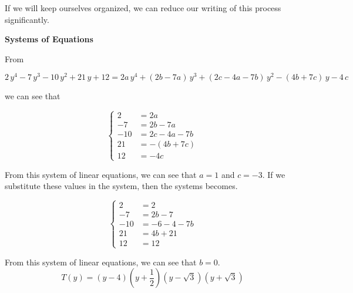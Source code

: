 \documentclass{ximera}
\begin{document}
If we will keep ourselves organized, we can reduce our writing of this process significantly.




\begin{procedure} \textbf{\textcolor{purple!85!blue}{Systems of Equations}} 



From

\[
2 \, y^4 - 7 \, y^3 - 10 \, y^2 + 21 \, y + 12 = 2 a \, y^4 + (2 b - 7 a) \, y^3 + (2 c - 4 a - 7 b) \, y^2 - (4 b + 7 c) \, y - 4 \, c
\]

we can see that 




\[
\begin{cases}
  2 &= 2 a   \\
  -7 &= 2 b - 7 a    \\
  -10 &= 2 c - 4 a - 7 b   \\
  21 &= -(4 b + 7 c)   \\
  12 &= -4 c
\end{cases}
\]


From this system of linear equations, we can see that $a = 1$ and $c = -3$.  If we substitute these values in the system, then the systems becomes.






\[
\begin{cases}
  2 &= 2   \\
  -7 &= 2 b - 7     \\
  -10 &= -6 - 4 - 7 b   \\
  21 &= 4 b + 21   \\
  12 &= 12
\end{cases}
\]

From this system of linear equations, we can see that $b = 0$. \\



\[
T(y) = (y-4) \left(y+\frac{1}{2}\right) (y - \sqrt{3}) (y + \sqrt{3})
\]




\end{procedure}
\end{document}
